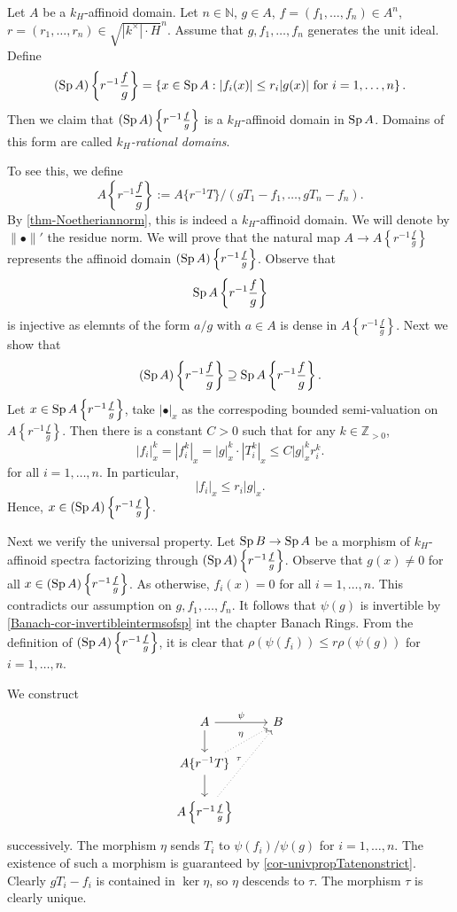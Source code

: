\begin{example}\label{ex-rationaldomains}
    Let $A$ be a $k_H$-affinoid domain. Let $n\in \mathbb{N}$, $g\in A$, $f=(f_1,\ldots,f_n)\in A^n$, $r=(r_1,\ldots,r_n)\in \sqrt{|k^{\times}|\cdot H}^n$. Assume that $g,f_1,\ldots,f_n$ generates the unit ideal. Define
    \[
        (\operatorname{Sp} A)\left\{r^{-1}\frac{f}{g}\right\}=\left\{ x\in \operatorname{Sp} A: |f_i(x)|\leq r_i|g(x)|\text{ for }i=1,\ldots,n \right\}.  
    \]
    Then we claim that $(\operatorname{Sp} A)\left\{r^{-1}\frac{f}{g}\right\}$ is a $k_H$-affinoid domain in $\operatorname{Sp} A$. Domains of this form are called \emph{$k_H$-rational domains}.

    To see this, we define
    \[
        A\left\{r^{-1}\frac{f}{g}\right\}:=A\{r^{-1}T\}/(gT_1-f_1,\ldots,gT_n-f_n).
    \]
    By \cref{thm-Noetheriannorm}, this is indeed a $k_H$-affinoid domain. We will denote by $\|\bullet\|'$ the residue norm. We will prove that the natural map $A\rightarrow A\left\{r^{-1}\frac{f}{g}\right\}$ represents the affinoid domain $(\operatorname{Sp} A)\left\{r^{-1}\frac{f}{g}\right\}$. Observe that 
    \[
        \operatorname{Sp} A\left\{r^{-1}\frac{f}{g}\right\}
    \]
    is injective as elemnts of the form $a/g$ with $a\in A$ is dense in $A\left\{r^{-1}\frac{f}{g}\right\}$. Next we show that
    \[
        (\operatorname{Sp} A)\left\{r^{-1}\frac{f}{g}\right\}\supseteq \operatorname{Sp} A\left\{r^{-1}\frac{f}{g}\right\}.
    \]
    Let $x\in \operatorname{Sp} A\left\{r^{-1}\frac{f}{g}\right\}$, take $|\bullet|_x$ as the correspoding bounded semi-valuation on $A\left\{r^{-1}\frac{f}{g}\right\}$. Then there is a constant $C>0$ such that for any $k\in \mathbb{Z}_{>0}$,
    \[
        |f_i|_x^k=|f_i^k|_x=|g|_x^k \cdot |T_i^k|_x
        \leq C|g|_x^k r_i^k.
    \]
    for all $i=1,\ldots,n$. In particular,
    \[
        |f_i|_x\leq r_i|g|_x.  
    \]
    Hence, $x\in (\operatorname{Sp} A)\left\{r^{-1}\frac{f}{g}\right\}$.

    Next we verify the universal property. Let $\operatorname{Sp} B\rightarrow \operatorname{Sp} A$ be a morphism of $k_H$-affinoid spectra factorizing through $(\operatorname{Sp} A)\left\{r^{-1}\frac{f}{g}\right\}$. 
    Observe that $g(x)\neq 0$ for all $x\in (\operatorname{Sp} A)\left\{r^{-1}\frac{f}{g}\right\}$. As otherwise, $f_i(x)=0$ for all $i=1,\ldots,n$. This contradicts our assumption on $g,f_1,\ldots,f_n$.
    It follows that $\psi(g)$ is invertible by \cref{Banach-cor-invertibleintermsofsp} int the chapter Banach Rings. From the definition of $(\operatorname{Sp} A)\left\{r^{-1}\frac{f}{g}\right\}$, it is clear that $\rho(\psi(f_i))\leq r\rho(\psi(g))$ for $i=1,\ldots,n$.
    
    We construct 
    \[
        \begin{tikzcd}
            A \arrow[r, "\psi"] \arrow[d]                  & B \\
            {A\{r^{-1}T\}} \arrow[d] \arrow[ru, dotted,"\eta"] &   \\
            {A\left\{r^{-1}\frac{f}{g}\right\}} \arrow[ruu, dotted, "\tau"]          &  
        \end{tikzcd}
    \]
    successively. The morphism $\eta$ sends $T_i$ to $\psi(f_i)/\psi(g)$ for $i=1,\ldots,n$.  The existence of such a morphism is guaranteed by \cref{cor-univpropTatenonstrict}.  Clearly $gT_i-f_i$ is contained in $\ker \eta$, so $\eta$ descends to $\tau$. The morphism $\tau$ is clearly unique.


\end{example}
